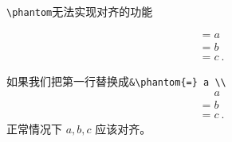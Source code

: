 

\verb|\phantom|无法实现对齐的功能

\begin{equation}
\begin{aligned}
&= a \\
&= b \\
&= c~.
\end{aligned}
\end{equation}

如果我们把第一行替换成\verb|&\phantom{=} a \\|
\begin{equation}
\begin{aligned}
&\phantom{=} a \\
&= b \\
&= c~.
\end{aligned}
\end{equation}
正常情况下 $a, b, c$ 应该对齐。